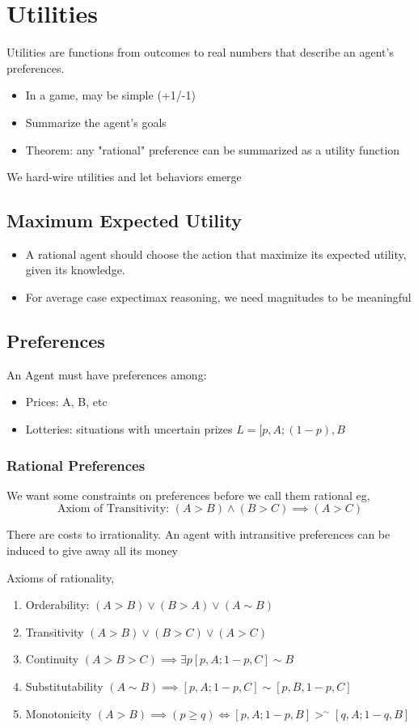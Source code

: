 \chapter{Utilities}
Utilities are functions from outcomes to real numbers that describe an agent's preferences.
\begin{itemize}
    \item In a game, may be simple (+1/-1)
    \item Summarize the agent's goals
    \item Theorem: any "rational" preference can be summarized as a utility function
\end{itemize}
We hard-wire utilities and let behaviors emerge
 

\section{Maximum Expected Utility }
\begin{itemize}
    \item A rational agent should choose the action that maximize its expected utility, given its knowledge.
    \item For average case expectimax reasoning, we need magnitudes to be meaningful
\end{itemize}


\section{Preferences}
An Agent must have preferences among:
\begin{itemize}
    \item Prices: A, B, etc
    \item Lotteries: situations with uncertain prizes $L = [p,A; (1 - p),B$
\end{itemize}

\subsection{Rational Preferences}
We want some  constraints on preferences before we call them rational eg, 
$$ \text{Axiom of Transitivity: } (A > B) \wedge (B > C) \implies (A > C) $$ 

There are costs to irrationality. An agent with intransitive preferences can be induced to give away all its money

Axioms of rationality, 
\begin{enumerate}
    \item Orderability:  $(A > B) \vee (B > A) \vee (A \sim B)$
    \item Transitivity  $(A > B) \vee (B > C) \vee (A > C)$
    \item Continuity  $(A > B > C) \implies \exists p[p, A; 1 - p, C] \sim B$
    \item Substitutability  $(A \sim B) \implies [p,A; 1 - p, C] \sim [p, B, 1 - p, C]$
    \item Monotonicity  $(A > B) \implies (p \ge q) \iff [p, A; 1 - p, B ] >^{\sim} [q, A; 1 - q, B]$
\end{enumerate}


